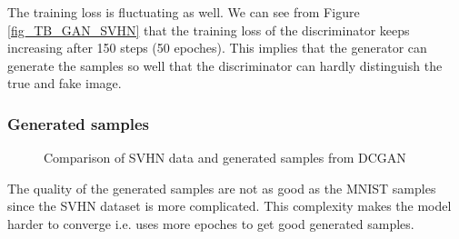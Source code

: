 \documentclass{article}
\begin{document}
The training loss is fluctuating as well. We can see from Figure \ref{fig_TB_GAN_SVHN} that the training loss of the discriminator keeps increasing after 150 steps (50 epoches). This implies that the generator can generate the samples so well that the discriminator can hardly distinguish the true and fake image.

\subsubsection{Generated samples}

\begin{figure}[!htb]
  \centering
  \caption{Comparison of SVHN data and generated samples from DCGAN}
  \label{fig_DCGAN_SVHN}
\end{figure}

The quality of the generated samples are not as good as the MNIST samples since the SVHN dataset is more complicated.
This complexity makes the model harder to converge i.e. uses more epoches to get good generated samples.
\end{document}
